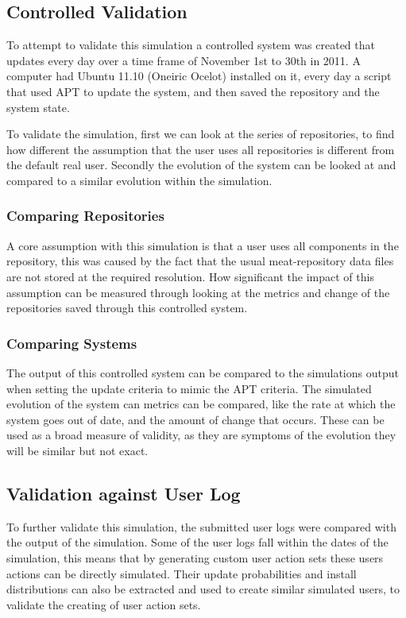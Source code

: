 \subsection{Controlled Validation}
To attempt to validate this simulation a controlled system was created that updates every day over a time frame of November 1st to 30th in 2011.
A computer had Ubuntu 11.10 (Oneiric Ocelot) installed on it, every day a script that used APT to update the system, and then saved the repository and the system state.

To validate the simulation, first we can look at the series of repositories, to find how different the assumption that the user uses all repositories is different from the default real user.
Secondly the evolution of the system can be looked at and compared to a similar evolution within the simulation.

\subsubsection{Comparing Repositories}
A core assumption with this simulation is that a user uses all components in the repository, 
this was caused by the fact that the usual meat-repository data files are not stored at the required resolution.
How significant the impact of this assumption can be measured through looking at the metrics and change of the repositories saved through this controlled system.


\subsubsection{Comparing Systems}
The output of this controlled system can be compared to the simulations output when setting the update criteria to mimic the APT criteria.
The simulated evolution of the system can metrics can be compared, like the rate at which the system goes out of date, and the amount of change that occurs.
These can be used as a broad measure of validity, as they are symptoms of the evolution they will be similar but not exact.


\subsection{Validation against User Log}
To further validate this simulation, the submitted user logs were compared with the output of the simulation.
Some of the user logs fall within the dates of the simulation, this means that by generating custom user action sets these users actions can be directly simulated.
Their update probabilities and install distributions can also be extracted and used to create similar simulated users, to validate the creating of user action sets.

